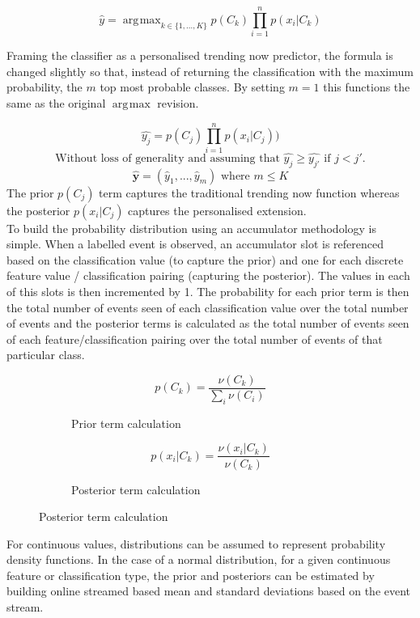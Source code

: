 \documentclass[a4paper,11pt]{scrreprt}
\DeclareMathOperator*{\argmax}{\arg\!\max}
\begin{document}
\[\hat{y}=\argmax_{k \in \{1,...,K\}} p(C_k)\prod_{i=1}^n p(x_i | C_k)\]

Framing the classifier as a personalised trending now predictor, the formula is changed slightly so that, instead of returning the classification with the maximum probability, the \(m\) top most probable classes. By setting \(m=1\) this functions the same as the original \(\argmax\) revision. 

\[\hat{y_j}= p(C_j)\prod_{i=1}^n p(x_i | C_j))\]
\[\text{Without loss of generality and assuming that }  \hat{y_j} \geq \hat{y_{j'}} \text{ if } j < j'.\]
\[\mathbf{\hat{y}} = (\hat{y}_1, ..., \hat{y}_m) \text{ where } m \leq K\]
The prior \(p(C_j)\) term captures the traditional trending now function whereas the posterior \(p(x_i | C_j)\) captures the personalised extension.\\
To build the probability distribution using an accumulator methodology is simple. When a labelled event is observed, an accumulator slot is referenced based on the classification value (to capture the prior) and one for each discrete feature value / classification pairing (capturing the posterior). The values in each of this slots is then incremented by 1. The probability for each prior term is then the total number of events seen of each classification value over the total number of events and the posterior terms is calculated as the total number of events seen of each feature/classification pairing over the total number of events of that particular class.

\begin{figure}[h!]
\begin{subfigure}[t]{2 in}
\[p(C_k) = \frac{\nu(C_k)}{\sum_{i} \nu(C_i)}\]
\caption{Prior term calculation}
\end{subfigure}
\begin{subfigure}[t]{2 in}
\[p(x_i | C_k) = \frac{\nu(x_i | C_k)}{\nu(C_k)}\]
\caption{Posterior term calculation}
\end{subfigure}
\end{figure}
For continuous values, distributions can be assumed to represent probability density functions. In the case of a normal distribution, for a given continuous feature or classification type, the prior and posteriors can be estimated by building online streamed based mean and standard deviations based on the event stream. 
\end{document}
